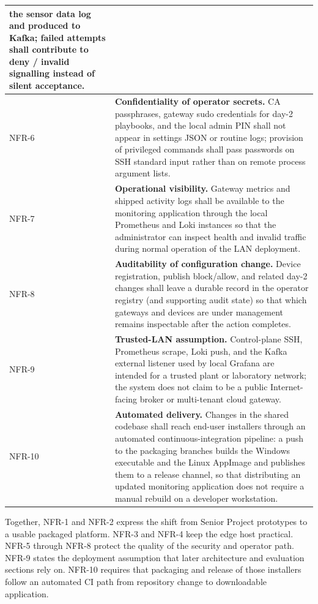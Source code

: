 \documentclass[12pt,a4paper]{report}
\begin{document}
\begin{longtable}{@{}p{1.6cm}p{\dimexpr\textwidth-1.6cm-4\tabcolsep\relax}@{}}
  the sensor data log and produced to Kafka; failed
  attempts shall contribute to deny / invalid signalling
  instead of silent acceptance. \\
\midrule
NFR-6
& \textbf{Confidentiality of operator secrets.}
  CA passphrases, gateway sudo credentials for day-2
  playbooks, and the local admin PIN shall not appear in
  settings JSON or routine logs; provision of privileged
  commands shall pass passwords on SSH standard input
  rather than on remote process argument lists. \\
\midrule
NFR-7
& \textbf{Operational visibility.}
  Gateway metrics and shipped activity logs shall be
  available to the monitoring application through the
  local Prometheus and Loki instances so that the
  administrator can inspect health and invalid traffic
  during normal operation of the LAN deployment. \\
\midrule
NFR-8
& \textbf{Auditability of configuration change.}
  Device registration, publish block/allow, and related
  day-2 changes shall leave a durable record in the
  operator registry (and supporting audit state) so that
  which gateways and devices are under management remains
  inspectable after the action completes. \\
\midrule
NFR-9
& \textbf{Trusted-LAN assumption.}
  Control-plane SSH, Prometheus scrape, Loki push, and
  the Kafka external listener used by local Grafana are
  intended for a trusted plant or laboratory network;
  the system does not claim to be a public
  Internet-facing broker or multi-tenant cloud gateway. \\
\midrule
NFR-10
& \textbf{Automated delivery.}
  Changes in the shared codebase shall reach end-user
  installers through an automated continuous-integration
  pipeline: a push to the packaging branches
  builds the Windows executable and the Linux AppImage
  and publishes them to a release channel, so that distributing an
  updated monitoring application does not require a
  manual rebuild on a developer workstation. \\
\end{longtable}

Together, NFR-1 and NFR-2 express the shift from Senior
Project prototypes to a usable packaged platform.
NFR-3 and NFR-4 keep the edge host practical.
NFR-5 through NFR-8 protect the quality of the security
and operator path. NFR-9 states the deployment
assumption that later architecture and evaluation
sections rely on. NFR-10 requires that packaging and
release of those installers follow an automated CI
path from repository change to downloadable
application.
\end{document}

